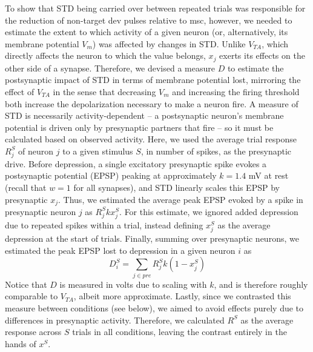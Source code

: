 \documentclass[pdflatex,referee,iicol,sn-basic]{sn-jnl}
\theoremstyle{thmstyleone}%
\theoremstyle{thmstyletwo}%
\theoremstyle{thmstylethree}%
\begin{document}
To show that STD being carried over between repeated trials was responsible for the reduction of non-target dev pulses relative to msc, however, we needed to estimate the extent to which activity of a given neuron (or, alternatively, its membrane potential $V_m$) was affected by changes in STD. Unlike $V_{TA}$, which directly affects the neuron to which the value belongs, $x_j$ exerts its effects on the other side of a synapse. Therefore, we devised a measure $D$ to estimate the postsynaptic impact of STD in terms of membrane potential lost, mirroring the effect of $V_{TA}$ in the sense that decreasing $V_m$ and increasing the firing threshold both increase the depolarization necessary to make a neuron fire.
A measure of STD is necessarily activity-dependent -- a postsynaptic neuron's membrane potential is driven only by presynaptic partners that fire -- so it must be calculated based on observed activity. Here, we used the average trial response $R_j^S$ of neuron $j$ to a given stimulus $S$, in number of spikes, as the presynaptic drive. Before depression, a single excitatory presynaptic spike evokes a postsynaptic potential (EPSP) peaking at approximately $k = 1.4$ mV at rest (recall that $w = 1$ for all synapses), and STD linearly scales this EPSP by presynaptic $x_j$. Thus, we estimated the average peak EPSP evoked by a spike in presynaptic neuron $j$ as $R_j^S k x_j^S$. For this estimate, we ignored added depression due to repeated spikes within a trial, instead defining $x_j^S$ as the average depression at the start of trials. Finally, summing over presynaptic neurons, we estimated the peak EPSP lost to depression in a given neuron $i$ as
\begin{equation}
    D_i^S = \sum_{j \in pre} R_j^S k (1-x_j^S)
\end{equation}
Notice that $D$ is measured in volts due to scaling with $k$, and is therefore roughly comparable to $V_{TA}$, albeit more approximate. Lastly, since we contrasted this measure between conditions (see below), we aimed to avoid effects purely due to differences in presynaptic activity. Therefore, we calculated $R^S$ as the average response across $S$ trials in all conditions, leaving the contrast entirely in the hands of $x^S$.
\end{document}
